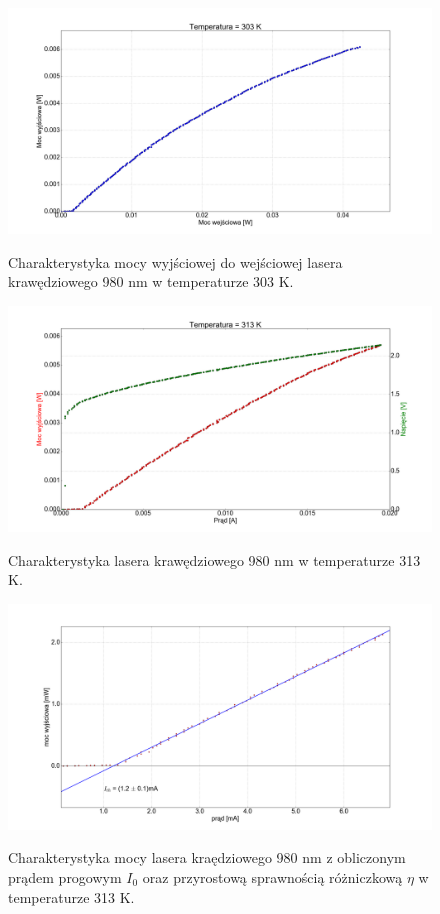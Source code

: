 \documentclass[a4paper, portrait,12pt]{report}
\begin{document}
\begin{figure}
\center
  \includegraphics[scale=0.30]{plot980/temp_30_power.png}
  \label{rys1}
  \caption{Charakterystyka mocy wyjściowej do wejściowej lasera krawędziowego 980 nm w temperaturze 303 K.} 
\end{figure}



\begin{figure}
\center
  \includegraphics[scale=0.30]{plot980/temp_40_IVL.png}
  \label{rys1}
  \caption{Charakterystyka lasera krawędziowego 980 nm w temperaturze 313 K.} 
\end{figure}


\begin{figure}
\center
  \includegraphics[scale=0.30]{plot980/temp_40_fit.png}
  \label{rys1}
  \caption{Charakterystyka mocy lasera kraędziowego 980 nm z obliczonym prądem progowym $I_0$ oraz przyrostową sprawnością różniczkową $\eta$ w temperaturze 313 K.} 
\end{figure}
\end{document}
